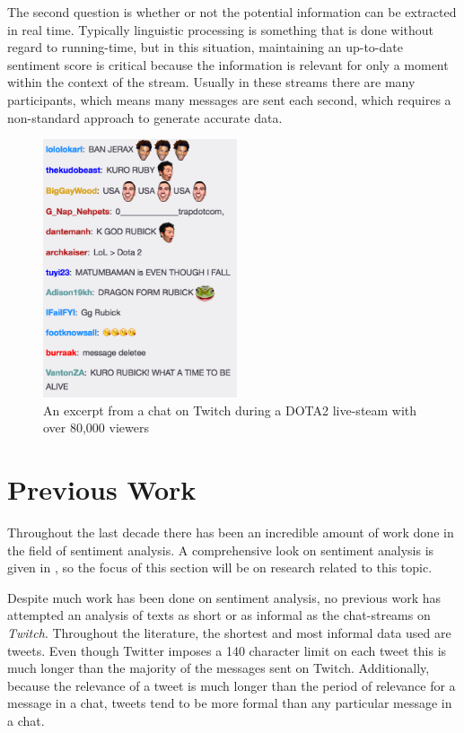 \documentclass[12pt]{article}
\begin{document}
The second question is whether or not the potential information can be extracted in real time. Typically linguistic processing is something that is done without regard to running-time, but in this situation, maintaining an up-to-date sentiment score is critical because the information is relevant for only a moment within the context of the stream. Usually in these streams there are many participants, which means many messages are sent each second, which requires a non-standard approach to generate accurate data.

\begin{figure}
\centering
	\includegraphics[height=3in]{example.png}
	\caption{\label{fig:chat}An excerpt from a chat on Twitch during a DOTA2 live-steam with over 80,000 viewers}
\end{figure}

\section{Previous Work}
Throughout the last decade there has been an incredible amount of work done in the field of sentiment analysis. A comprehensive look on sentiment analysis is given in \cite{Liu2012}, so the focus of this section will be on research related to this topic.

Despite much work has been done on sentiment analysis, no previous work has attempted an analysis of texts as short or as informal as the chat-streams on \textit{Twitch}. Throughout the literature, the shortest and most informal data used are tweets. Even though Twitter imposes a 140 character limit on each tweet this is much longer than the majority of the messages sent on Twitch. Additionally, because the relevance of a tweet is much longer than the period of relevance for a message in a chat, tweets tend to be more formal than any particular message in a chat. 
\end{document}
